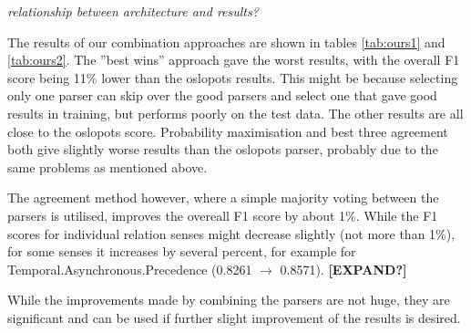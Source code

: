 \documentclass[10pt,notitlepage]{scrartcl}
\begin{document}
\textit{relationship between architecture and results?}

The results of our combination approaches are shown in tables \ref{tab:ours1} and \ref{tab:ours2}. The ''best wins'' approach gave the worst results, with the overall F1 score being 11\% lower than the oslopots results. This might be because selecting only one parser can skip over the good parsers and select one that gave good results in training, but performs poorly on the test data. The other results are all close to the oslopots score. Probability maximisation and best three agreement both give slightly worse results than the oslopots parser, probably due to the same problems as mentioned above.

The agreement method however, where a simple majority voting between the parsers is utilised, improves the overeall F1 score by about 1\%. While the F1 scores for individual relation senses might decrease slightly (not more than 1\%), for some senses it increases by several percent, for example for Temporal.Asynchronous.Precedence (0.8261 $\rightarrow$ 0.8571). \textbf{[EXPAND?]}

While the improvements made by combining the parsers are not huge, they are significant and can be used if further slight improvement of the results is desired.
\end{document}
